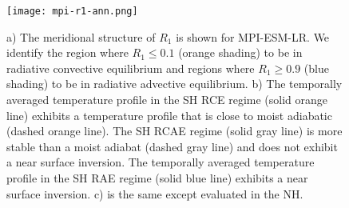 \documentclass{ametsocV5}
\begin{document}
%

%

\begin{figure}[t]
  \noindent\texttt{[image: mpi-r1-ann.png]}\\
  \caption{a) The meridional structure of \(R_{1}\) is shown for MPI-ESM-LR. We identify the region where \(R_{1}\le 0.1\) (orange shading) to be in radiative convective equilibrium and regions where \(R_{1}\ge 0.9\) (blue shading) to be in radiative advective equilibrium. b) The temporally averaged temperature profile in the SH RCE regime (solid orange line) exhibits a temperature profile that is close to moist adiabatic (dashed orange line). The SH RCAE regime (solid gray line) is more stable than a moist adiabat (dashed gray line) and does not exhibit a near surface inversion. The temporally averaged temperature profile in the SH RAE regime (solid blue line) exhibits a near surface inversion. c) is the same except evaluated in the NH.}
  \label{fig:mpi-r1-ann}
\end{figure}
\end{document}
